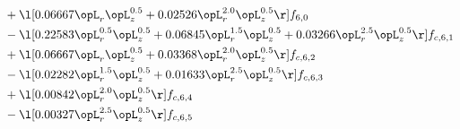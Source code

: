 \begin{alignat}{2}
& + \l[  0.06667 \opL_r \opL_z^{0.5} +  0.02526 \opL_r^{2.0} \opL_z^{0.5}  \r] f_{6,0} \nonumber \\ 
& - \l[  0.22583 \opL_r^{0.5} \opL_z^{0.5} +  0.06845 \opL_r^{1.5} \opL_z^{0.5} +  0.03266 \opL_r^{2.5} \opL_z^{0.5}  \r] f_{c,6,1} \nonumber \\ 
& + \l[  0.06667 \opL_r \opL_z^{0.5} +  0.03368 \opL_r^{2.0} \opL_z^{0.5}  \r] f_{c,6,2} \nonumber \\ 
& - \l[  0.02282 \opL_r^{1.5} \opL_z^{0.5} +  0.01633 \opL_r^{2.5} \opL_z^{0.5}  \r] f_{c,6,3} \nonumber \\ 
& + \l[  0.00842 \opL_r^{2.0} \opL_z^{0.5}  \r] f_{c,6,4} \nonumber \\ 
& - \l[  0.00327 \opL_r^{2.5} \opL_z^{0.5}  \r] f_{c,6,5} \nonumber \\ 
\end{alignat} 


